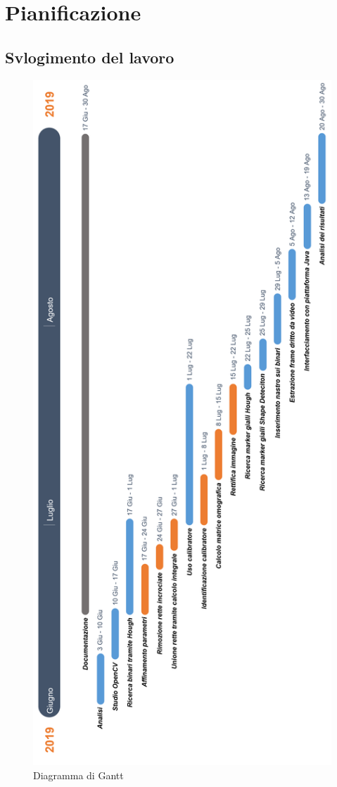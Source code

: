\documentclass[twoside]{supsistudent}
\begin{document}
\chapter{Pianificazione}
\section{Svlogimento del lavoro}

\begin{figure}[H]
  \center
  \includegraphics[scale=0.35]{images/Timeline.png}
  \caption{Diagramma di Gantt}
\end{figure}
\end{document}
